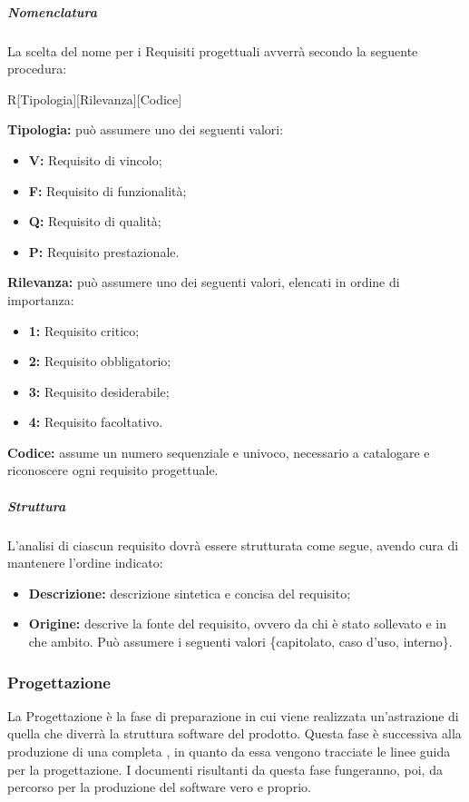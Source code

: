 \subparagraph{Nomenclatura}
La scelta del nome per i Requisiti progettuali avverrà secondo la seguente procedura:

\begin{center}
R[Tipologia][Rilevanza][Codice]
\end{center}

\textbf{Tipologia:} può assumere uno dei seguenti valori:

\begin{itemize}
	\item \textbf{V:} Requisito di vincolo;
	\item \textbf{F:} Requisito di funzionalità;
	\item \textbf{Q:} Requisito di qualità;
	\item \textbf{P:} Requisito prestazionale.
\end{itemize}

\textbf{Rilevanza:} può assumere uno dei seguenti valori, elencati in ordine di importanza:

\begin{itemize}
	\item \textbf{1:} Requisito critico;
	\item \textbf{2:} Requisito obbligatorio;
	\item \textbf{3:} Requisito desiderabile;
	\item \textbf{4:} Requisito facoltativo.
\end{itemize}

\textbf{Codice:} assume un numero sequenziale e univoco, necessario a catalogare e riconoscere ogni requisito progettuale.

\subparagraph{Struttura}
L'analisi di ciascun requisito dovrà essere strutturata come segue, avendo cura di mantenere l'ordine indicato:

\begin{itemize}
  \item \textbf{Descrizione:} descrizione sintetica e concisa del requisito;
  \item \textbf{Origine:} descrive la fonte del requisito, ovvero da chi è stato sollevato e in che ambito. Può assumere i seguenti valori \{capitolato, caso d'uso, interno\}.
\end{itemize}

\subsubsection{Progettazione}

La Progettazione è la fase di preparazione in cui viene realizzata un'astrazione di quella che diverrà la struttura software del prodotto. Questa fase è successiva alla produzione di una completa \AdR, in quanto da essa vengono tracciate le linee guida per la progettazione. I documenti risultanti da questa fase fungeranno, poi, da percorso per la produzione del software vero e proprio.

